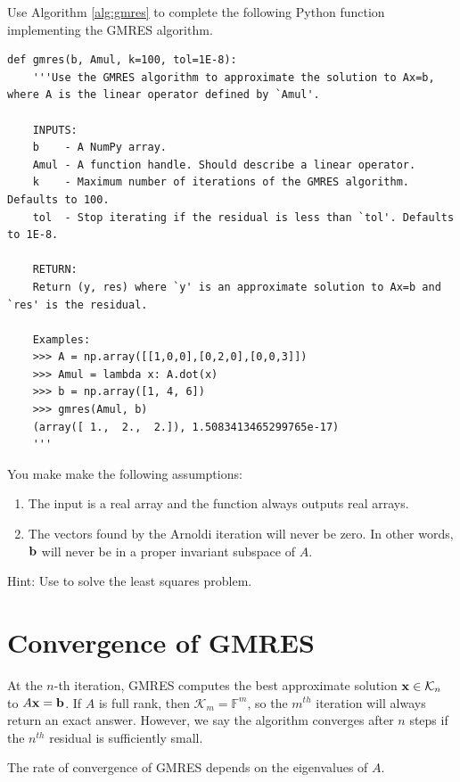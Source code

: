 \begin{problem}
Use Algorithm \ref{alg:gmres} to complete the following Python function implementing the GMRES algorithm.
\begin{lstlisting}
def gmres(b, Amul, k=100, tol=1E-8):
    '''Use the GMRES algorithm to approximate the solution to Ax=b, where A is the linear operator defined by `Amul'.
    
    INPUTS:
    b    - A NumPy array.
    Amul - A function handle. Should describe a linear operator.
    k    - Maximum number of iterations of the GMRES algorithm. Defaults to 100.
    tol  - Stop iterating if the residual is less than `tol'. Defaults to 1E-8.
    
    RETURN:
    Return (y, res) where `y' is an approximate solution to Ax=b and `res' is the residual.
    
    Examples:
    >>> A = np.array([[1,0,0],[0,2,0],[0,0,3]])
    >>> Amul = lambda x: A.dot(x)
    >>> b = np.array([1, 4, 6])
    >>> gmres(Amul, b)
    (array([ 1.,  2.,  2.]), 1.5083413465299765e-17)
    '''
\end{lstlisting}
You make make the following assumptions:
\begin{enumerate}
\item The input  is a real array and the function  always outputs real arrays.
\item The vectors found by the Arnoldi iteration will never be zero. In other words, ${\bf b}$ will never be in a proper invariant subspace of $A$.
\end{enumerate}

Hint: Use  to solve the least squares problem.
\label{prob:MyGMRES}
\end{problem}



\section*{Convergence of GMRES}
At the $n$-th iteration, GMRES computes the best approximate solution ${\bf x} \in \mathcal{K}_n$ to $A{\bf x} = {\bf b}$.
If $A$ is full rank, then $\mathcal{K}_m = \mathbb{F}^m$, so the $m^{th}$ iteration will always return an exact answer.
However, we say the algorithm converges after $n$ steps if the $n^{th}$ residual is sufficiently small.

The rate of convergence of GMRES depends on the eigenvalues of $A$.

